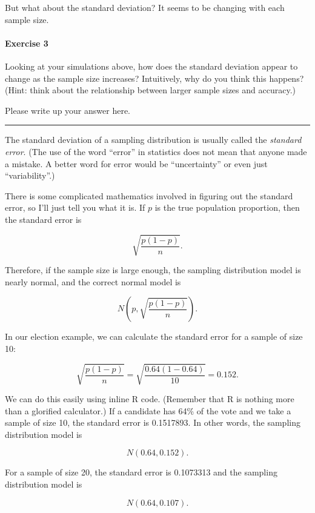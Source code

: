 \documentclass[
]{book}
\begin{document}
But what about the standard deviation? It seems to be changing with each sample size.

\hypertarget{exercise-3-9}{%
\paragraph*{Exercise 3}\label{exercise-3-9}}

Looking at your simulations above, how does the standard deviation appear to change as the sample size increases? Intuitively, why do you think this happens? (Hint: think about the relationship between larger sample sizes and accuracy.)

Please write up your answer here.

\begin{center}\rule{0.5\linewidth}{0.5pt}\end{center}

The standard deviation of a sampling distribution is usually called the \emph{standard error}. (The use of the word ``error'' in statistics does not mean that anyone made a mistake. A better word for error would be ``uncertainty'' or even just ``variability''.)

There is some complicated mathematics involved in figuring out the standard error, so I'll just tell you what it is. If \(p\) is the true population proportion, then the standard error is

\[
\sqrt{\frac{p(1 - p)}{n}}.
\]

Therefore, if the sample size is large enough, the sampling distribution model is nearly normal, and the correct normal model is

\[
N\left(p, \sqrt{\frac{p(1 - p)}{n}}\right).
\]

In our election example, we can calculate the standard error for a sample of size 10:

\[
\sqrt{\frac{p(1 - p)}{n}} = \sqrt{\frac{0.64(1 - 0.64)}{10}} = 0.152.
\]

We can do this easily using inline R code. (Remember that R is nothing more than a glorified calculator.) If a candidate has 64\% of the vote and we take a sample of size 10, the standard error is 0.1517893. In other words, the sampling distribution model is

\[
N(0.64, 0.152).
\]

For a sample of size 20, the standard error is 0.1073313 and the sampling distribution model is

\[
N(0.64, 0.107).
\]
\end{document}
